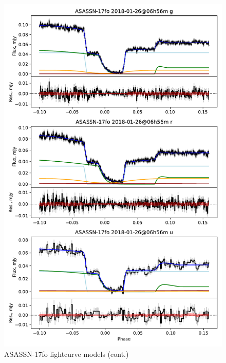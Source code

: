 \begin{figure}
    \centering
    \includegraphics[width=\textwidth]{figures/results/ASASSN-17fo/ASASSN-17fo_3.pdf}
    \caption{ASASSN-17fo lightcurve models (cont.)}
    \label{fig:ASASSN-17fo all lightcurves cont 2}
\end{figure}



